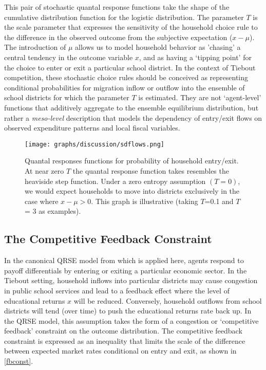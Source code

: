 \medskip


This pair of stochastic quantal response functions take the shape of
the cumulative distribution function for the logistic
distribution. The parameter $T$ is the scale parameter that expresses
the sensitivity of the household choice rule to the difference in the
observed outcome from the subjective expectation ($x-\mu$). The
introduction of $\mu$ allows us to model household behavior as
'chasing' a central tendency in the outcome variable $x$, and as
having a `tipping point' for the choice to enter or exit a particular
school district. In the context of Tiebout competition, these
stochastic choice rules should be conceived as representing
conditional probabilities for migration inflow or outflow into the
ensemble of school districts for which the parameter $T$ is
estimated. They are not `agent-level' functions that additively
aggregate to the ensemble equilibrium distribution, but rather a
\emph{meso-level} description that models the dependency of entry/exit
flows on observed expenditure patterns and local fiscal variables.

\medskip

\begin{figure}[htb]
\centering
\texttt{[image: graphs/discussion/sdflows.png]}
\caption{\label{qexample}Quantal responses functions for probability of household entry/exit. At near zero $T$ the quantal response function takes resembles the heaviside step function. Under a zero entropy assumption $(T=0)$, we would expect households to move into districts exclusively in the case where $x - \mu  > 0$.  This graph is illustrative (taking $T$=0.1 and $T$ = 3 as examples).}
\end{figure}


\subsection{The Competitive Feedback Constraint}
\label{sec-4-3}

In the canonical QRSE model from \citet{schafol} which is applied here,
agents respond to payoff differentials by entering or exiting a
particular economic sector. In the Tiebout setting, household inflows
into particular districts may cause congestion in public school
services and lead to a feedback effect where the level of educational
returns $x$ will be reduced. Conversely, household outflows from
school districts will tend (over time) to push the educational returns
rate back up. In the QRSE model, this assumption takes the form of a
congestion or `competitive feedback' constraint on the outcome
distribution. The competitive feedback constraint is expressed as an
inequality that limits the scale of the difference between expected market
rates conditional on entry and exit, as shown in \ref{fbconst}. 

